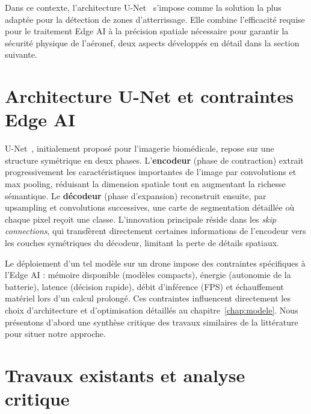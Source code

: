 Dans ce contexte, l'architecture U-Net~\cite{ronneberger2015unet} s'impose comme la solution la plus adaptée pour la détection de zones d'atterrissage. Elle combine l'efficacité requise pour le traitement Edge AI à la précision spatiale nécessaire pour garantir la sécurité physique de l'aéronef, deux aspects développés en détail dans la section suivante.


\section{Architecture U-Net et contraintes Edge AI}
\label{sec:unet-edge}

U-Net~\cite{ronneberger2015unet}, initialement proposé pour l'imagerie biomédicale, repose sur une structure symétrique en deux phases. L'\textbf{encodeur} (phase de contraction) extrait progressivement les caractéristiques importantes de l'image par convolutions et max pooling, réduisant la dimension spatiale tout en augmentant la richesse sémantique. Le \textbf{décodeur} (phase d'expansion) reconstruit ensuite, par upsampling et convolutions successives, une carte de segmentation détaillée où chaque pixel reçoit une classe. L'innovation principale réside dans les \textit{skip connections}, qui transfèrent directement certaines informations de l'encodeur vers les couches symétriques du décodeur, limitant la perte de détails spatiaux.

Le déploiement d'un tel modèle sur un drone impose des contraintes spécifiques à l'Edge AI : mémoire disponible (modèles compacts), énergie (autonomie de la batterie), latence (décision rapide), débit d'inférence (FPS) et échauffement matériel lors d'un calcul prolongé. Ces contraintes influencent directement les choix d'architecture et d'optimisation détaillés au chapitre~\ref{chap:modele}. Nous présentons d'abord une synthèse critique des travaux similaires de la littérature pour situer notre approche.

\section{Travaux existants et analyse critique}
\label{sec:travaux}

